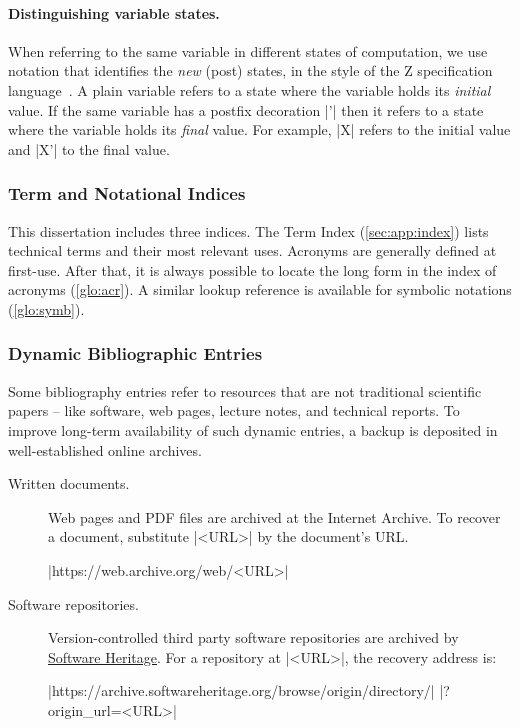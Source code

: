 \paragraph*{Distinguishing variable states.}
When referring to the same variable in different states of computation, we use notation that identifies the \emph{new} (post) states,
in the style of the Z specification language~\cite{spivey1992}.
A plain variable refers to a state where the variable holds its \emph{initial} value.
If the same variable has a postfix decoration \pr|'| then it refers to a state where the variable holds its \emph{final} value.
For example, \pr|X| refers to the initial value and \pr|X'| to the final value.

\subsubsection{Term and Notational Indices}

This dissertation includes three indices.
The Term Index (\autoref{sec:app:index}) lists technical terms and their most relevant uses.
Acronyms are generally defined at first-use.
After that, it is always possible to locate the long form in the index of acronyms (\autoref{glo:acr}).
A similar lookup reference is available for symbolic notations (\autoref{glo:symb}).

\subsubsection{Dynamic Bibliographic Entries}

Some bibliography entries refer to resources that are not traditional scientific papers --
like software, web pages, lecture notes, and technical reports.
To improve long-term availability of such dynamic entries, a backup is deposited in well-established online archives.

\begin{description}
\item[Written documents.]
Web pages and PDF files are archived at the Internet Archive.
To recover a document, substitute \pr|<URL>| by the document's URL.
\begin{center}
\pr|https://web.archive.org/web/<URL>|
\end{center}
\item[Software repositories.]
Version-controlled third party software repositories are archived by \href{https://softwareheritage.org/}{Software Heritage}.
For a repository at \pr|<URL>|, the recovery address is:%
\begin{center}
    \pr|https://archive.softwareheritage.org/browse/origin/directory/|
    \mbox{\pr|?origin_url=<URL>|}
\end{center}
\end{description}

